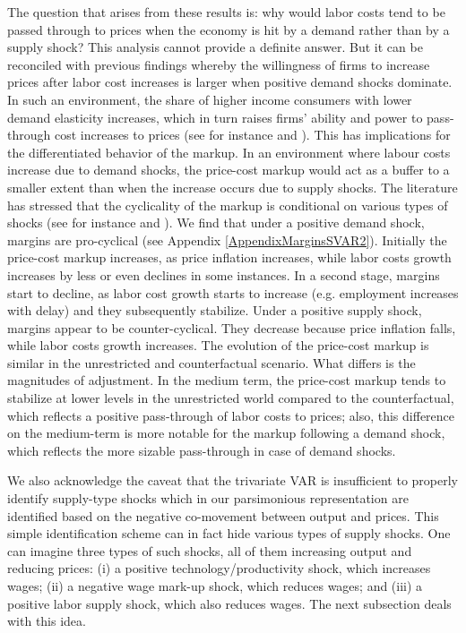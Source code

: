 \documentclass[11pt]{article}
\begin{document}
The question that arises from these results is: why would labor costs tend to be passed through to prices when the economy is hit by a demand rather than by a supply shock? This analysis cannot provide a definite answer. But it can be reconciled with previous findings whereby the willingness of firms to increase prices after labor cost increases is larger when positive demand shocks dominate. In such an environment, the share of higher income consumers with lower demand elasticity increases, which in turn raises firms’ ability and power to pass-through cost increases to prices (see for instance \cite{Dornbusch_87} and \cite{Bergin_Feenstra_01}). This has implications for the differentiated behavior of the markup. In an environment where labour costs increase due to demand shocks, the price-cost markup would act as a buffer to a smaller extent than when the increase occurs due to supply shocks. The literature has stressed that the cyclicality of the markup is conditional on various types of shocks (see for instance \cite{GaliGertlerLopez2007} and \cite{NekardaRamey13}). We find that under a positive demand shock, margins are pro-cyclical (see Appendix \ref{AppendixMarginsSVAR2}). Initially the price-cost markup increases, as price inflation increases, while labor costs growth increases by less or even declines in some instances. In a second stage, margins start to decline, as labor cost growth starts to increase (e.g. employment increases with delay) and they subsequently stabilize. Under a positive supply shock, margins appear to be counter-cyclical. They decrease because price inflation falls, while labor costs growth increases. The evolution of the price-cost markup is similar in the unrestricted and counterfactual scenario. What differs is the magnitudes of adjustment. In the medium term, the price-cost markup tends to stabilize at lower levels in the unrestricted world compared to the counterfactual, which reflects a positive pass-through of labor costs to prices; also, this difference on the medium-term is more notable for the markup following a demand shock, which reflects the more sizable pass-through in case of demand shocks.     


We also acknowledge the caveat that the trivariate VAR is insufficient to properly identify supply-type shocks which in our parsimonious representation are identified based on the negative co-movement between output and prices. This simple identification scheme can in fact hide various types of supply shocks. One can imagine three types of such shocks, all of them increasing output and reducing prices: (i) a positive technology/productivity shock, which increases wages; (ii) a negative wage mark-up shock, which reduces wages; and (iii) a positive labor supply shock, which also reduces wages. The next subsection deals with this idea.
\end{document}
